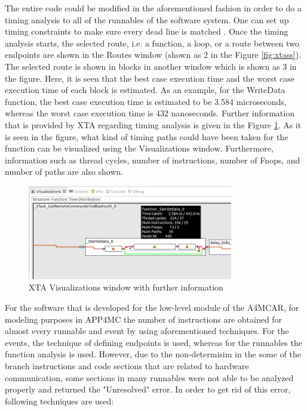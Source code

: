 The entire code could be modified in the aforementioned fashion in order to do a timing analysis to all of the runnables of the software system. One can set up timing constraints to make sure every dead line is matched \cite{xtamanual}. Once the timing analysis starts, the selected route, i.e. a function, a loop, or a route between two endpoints are shown in the Routes window (shown as 2 in the Figure \ref{fig:xtass}). The selected route is shown in blocks in another window which is shown as 3 in the figure. Here, it is seen that the best case execution time and the worst case execution time of each block is estimated. As an example, for the WriteData function, the best case execution time is estimated to be 3.584 microseconds, whereas the worst case execution time is 432 nanoseconds. Further information that is provided by XTA regarding timing analysis is given in the Figure \ref{fig:xtafurther}. As it is seen in the figure, what kind of timing paths could have been taken for the function can be visualized using the Visualizations window. Furthermore, information such as thread cycles, number of instructions, number of Fnops, and number of paths are also shown.

\begin{figure}[!ht]
	\centering
	\includegraphics[width=0.8\textwidth]{content/images/xtafurther.png}
	\caption{XTA Visualizations window with further information}
	\label{fig:xtafurther}
\end{figure}

For the software that is developed for the low-level module of the A4MCAR, for modeling purposes in APP4MC  the number of instructions are obtained for almost every runnable and event by using aforementioned techniques. For the events, the technique of defining endpoints is used, whereas for the runnables the function analysis is used. However, due to the non-determisim in the some of the branch instructions and code sections that are related to hardware communication, some sections in many runnables were not able to be analyzed properly and returned the "Unresolved" error. In order to get rid of this error, following techniques are used:

